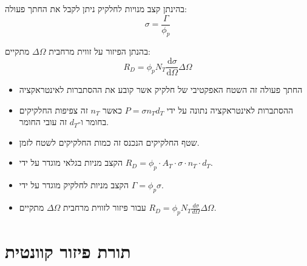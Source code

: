 \documentclass{tstextbook}
\begin{document}
\begin{corollary}
בהינתן קצב מנויות לחלקיק ניתן לקבל את החתך פעולה:
$$\sigma=\frac{\Gamma}{\phi_{p}}$$

\end{corollary}
\begin{proposition}
בהנתן הפיזור על זווית מרחבית \(\Delta \Omega\) מתקיים:
$$R_{D}=\phi_{p}N_{T}\frac{\mathrm{d} \sigma}{\mathrm{d} \Omega} \Delta \Omega$$

\end{proposition}
\begin{summary}
  \begin{itemize}
    \item החתך פעולה זה השטח האפקטיבי של חלקיק אשר קובע את ההסתברות לאינטראקציה
    \item ההסתברות לאינטראקציה נתונה על ידי \(P=\sigma n_{T}d_{T}\) כאשר \(n_{T}\) זה צפיפות החלקיקים בחומר ו-\(d_{T}\) זה עובי החומר.
    \item שטף החלקיקים הנכנס זה כמות החלקיקים לשטח לזמן. 
    \item הקצב מניות בגלאי מוגדר על ידי \(R_{D}=\phi_{p}\cdot A_{T}\cdot \sigma \cdot n_{T}\cdot d_{T}\).
    \item הקצב מניות לחלקיק מוגדר על ידי \(\Gamma=\phi_{p}\sigma\).
    \item עבור פיזור לזווית מרחבית \(\Delta \Omega\) מתקיים \(R_{D}=\phi_{p}N_{T}\frac{d\sigma}{d\Omega}\Delta\Omega\).
  \end{itemize}
\end{summary}
\section{תורת פיזור קוונטית}
\end{document}
